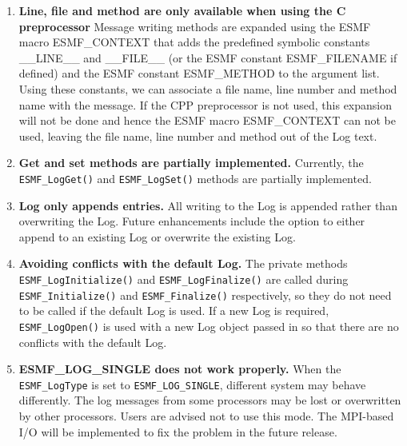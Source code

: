 %

\begin{enumerate}

\item {\bf Line, file and method are only available when using the C 
preprocessor}
Message writing methods are expanded using the ESMF macro ESMF\_CONTEXT 
that adds the predefined symbolic constants \_\_LINE\_\_ and \_\_FILE\_\_ (or 
the ESMF constant ESMF\_FILENAME if defined) and the ESMF constant ESMF\_METHOD 
to the argument list.  Using these constants, we can associate a file name, 
line number and method name with the message.  If the CPP preprocessor is not 
used, this expansion will not be done and hence the ESMF macro ESMF\_CONTEXT 
can not be used, leaving the file name, line number and method out of the Log 
text.

\item{\bf Get and set methods are partially implemented.}
Currently, the {\tt ESMF\_LogGet()} and {\tt ESMF\_LogSet()} methods are 
partially implemented.   

\item{\bf Log only appends entries.}
All writing to the Log is appended rather than overwriting the Log.  Future 
enhancements include the option to either append to an existing Log or 
overwrite the existing Log.

\item{\bf Avoiding conflicts with the default Log.}
The private methods {\tt ESMF\_LogInitialize()} and {\tt ESMF\_LogFinalize()} 
are called during {\tt ESMF\_Initialize()} and {\tt ESMF\_Finalize()} 
respectively, so they do not need to be called if the default Log is used. 
If a new Log is required, {\tt ESMF\_LogOpen()} is used with a new Log object 
passed in so that there are no conflicts with the default Log.

\item{\bf ESMF\_LOG\_SINGLE does not work properly.}
When the {\tt ESMF\_LogType} is set to {\tt ESMF\_LOG\_SINGLE}, different system may behave
differently.  The log messages from some processors may be lost or overwritten
by other processors.  Users are advised not to use this mode.  The MPI-based
I/O will be implemented to fix the problem in the future release. 


\end{enumerate}
